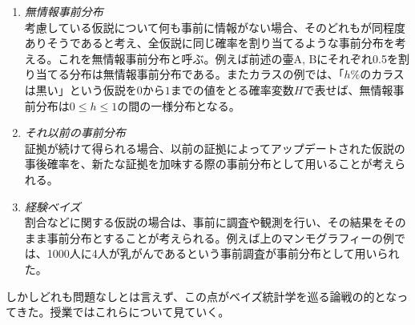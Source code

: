 \documentclass{jsarticle}
\begin{document}
\begin{enumerate}
 \item \emph{無情報事前分布}\\
       考慮している仮説について何も事前に情報がない場合、そのどれもが同程度ありそうであると考え、全仮説に同じ確率を割り当てるような事前分布を考える。これを無情報事前分布と呼ぶ。例えば前述の壷A, Bにそれぞれ0.5を割り当てる分布は無情報事前分布である。またカラスの例では、「$h\%$のカラスは黒い」という仮説を$0$から$1$までの値をとる確率変数$H$で表せば、無情報事前分布は$0 \leq h \leq 1$の間の一様分布となる。
 \item \emph{それ以前の事前分布}\\
       証拠が続けて得られる場合、以前の証拠によってアップデートされた仮説の事後確率を、新たな証拠を加味する際の事前分布として用いることが考えられる。
 \item \emph{経験ベイズ}\\
       割合などに関する仮説の場合は、事前に調査や観測を行い、その結果をそのまま事前分布とすることが考えられる。例えば上のマンモグラフィーの例では、1000人に4人が乳がんであるという事前調査が事前分布として用いられた。
\end{enumerate}
しかしどれも問題なしとは言えず、この点がベイズ統計学を巡る論戦の的となってきた。授業ではこれらについて見ていく。


\vspace{0.5em}


\end{document}
